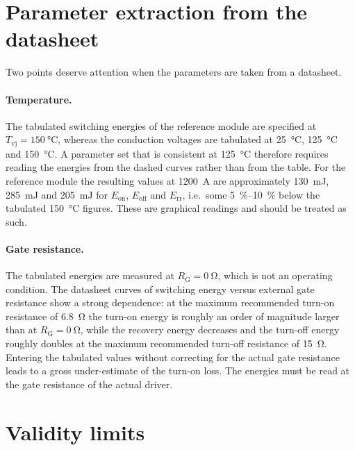 \documentclass[11pt,a4paper]{article}
\begin{document}
\section{Parameter extraction from the datasheet}
\label{sec:param}

Two points deserve attention when the parameters are taken from a datasheet.

\paragraph{Temperature.} The tabulated switching energies of the reference
module are specified at $T_\mathrm{vj} = \SI{150}{\degreeCelsius}$, whereas the
conduction voltages are tabulated at \SI{25}{\degreeCelsius},
\SI{125}{\degreeCelsius} and \SI{150}{\degreeCelsius}. A parameter set that is
consistent at \SI{125}{\degreeCelsius} therefore requires reading the energies
from the dashed curves rather than from the table. For the reference module the
resulting values at \SI{1200}{\ampere} are approximately
\SI{130}{\milli\joule}, \SI{285}{\milli\joule} and \SI{205}{\milli\joule} for
$E_\mathrm{on}$, $E_\mathrm{off}$ and $E_\mathrm{rr}$, i.e.\ some
\SIrange{5}{10}{\percent} below the tabulated \SI{150}{\degreeCelsius} figures.
These are graphical readings and should be treated as such.

\paragraph{Gate resistance.} The tabulated energies are measured at
$R_\mathrm{G} = \SI{0}{\ohm}$, which is not an operating condition. The
datasheet curves of switching energy versus external gate resistance show a
strong dependence: at the maximum recommended turn-on resistance of
\SI{6.8}{\ohm} the turn-on energy is roughly an order of magnitude larger than
at $R_\mathrm{G} = \SI{0}{\ohm}$, while the recovery energy decreases and the
turn-off energy roughly doubles at the maximum recommended turn-off resistance
of \SI{15}{\ohm}. Entering the tabulated values without correcting for the
actual gate resistance leads to a gross under-estimate of the turn-on loss. The
energies must be read at the gate resistance of the actual driver.

\section{Validity limits}
\end{document}
